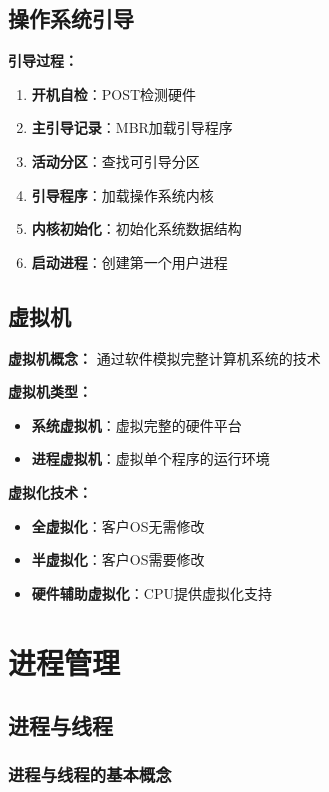 \documentclass[lang=cn,newtx,10pt,scheme=chinese]{../../elegantbook}
\begin{document}
\section{操作系统引导}

\textbf{引导过程：}
\begin{enumerate}
  \item \textbf{开机自检}：POST检测硬件
  \item \textbf{主引导记录}：MBR加载引导程序
  \item \textbf{活动分区}：查找可引导分区
  \item \textbf{引导程序}：加载操作系统内核
  \item \textbf{内核初始化}：初始化系统数据结构
  \item \textbf{启动进程}：创建第一个用户进程
\end{enumerate}

\section{虚拟机}

\textbf{虚拟机概念：}
通过软件模拟完整计算机系统的技术

\textbf{虚拟机类型：}
\begin{itemize}
  \item \textbf{系统虚拟机}：虚拟完整的硬件平台
  \item \textbf{进程虚拟机}：虚拟单个程序的运行环境
\end{itemize}

\textbf{虚拟化技术：}
\begin{itemize}
  \item \textbf{全虚拟化}：客户OS无需修改
  \item \textbf{半虚拟化}：客户OS需要修改
  \item \textbf{硬件辅助虚拟化}：CPU提供虚拟化支持
\end{itemize}

\chapter{进程管理}

\section{进程与线程}

\subsection{进程与线程的基本概念}
\end{document}

